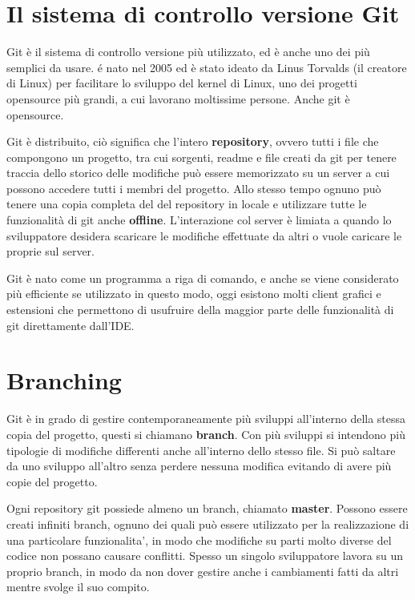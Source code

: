 \documentclass{article} \usepackage[textwidth=19cm,textheight=24cm]{geometry}
\begin{document}
\section{Il sistema di controllo versione Git}

Git è il sistema di controllo versione più utilizzato, ed è anche uno dei più
semplici da usare. é nato nel 2005 ed è stato ideato da Linus Torvalds (il
creatore di Linux) per facilitare lo sviluppo del kernel di Linux, uno dei
progetti opensource più grandi, a cui lavorano moltissime persone. Anche git è
opensource.

Git è distribuito, ciò significa che l'intero \textbf{repository}, ovvero
tutti i file che compongono un progetto, tra cui sorgenti, readme e file creati
da git per tenere traccia dello storico delle modifiche può essere memorizzato
su un server a cui possono accedere tutti i membri del progetto. Allo stesso
tempo ognuno può tenere una copia completa del del repository in locale e
utilizzare tutte le funzionalità di git anche \textbf{offline}. L'interazione col server
è limiata a quando lo sviluppatore desidera scaricare le modifiche effettuate da
altri o vuole caricare le proprie sul server.

Git è nato come un programma a riga di comando, e anche se viene considerato più
efficiente se utilizzato in questo modo, oggi esistono molti client grafici e
estensioni che permettono di usufruire della maggior parte delle funzionalità di
git direttamente dall'IDE.

\section{Branching}

Git è in grado di gestire contemporaneamente più sviluppi all'interno della
stessa copia del progetto, questi si chiamano \textbf{branch}. Con più sviluppi si 
intendono più tipologie di modifiche differenti anche all'interno dello stesso file.
Si può saltare da uno sviluppo all'altro senza perdere nessuna modifica
evitando di avere più copie del progetto.

Ogni repository git possiede almeno un branch, chiamato \textbf{master}.
Possono essere creati infiniti branch, ognuno dei quali può essere utilizzato
per la realizzazione di una particolare funzionalita', in modo che modifiche su parti
molto diverse del codice non possano causare conflitti. Spesso un singolo
sviluppatore lavora su un proprio branch, in modo da non dover gestire anche i
cambiamenti fatti da altri mentre svolge il suo compito. 
\end{document}
